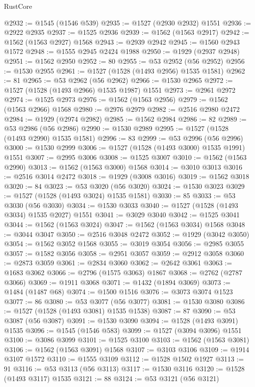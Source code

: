 \begin{lexlean}{RustCore}
\begin{coremodule}
@2932 := @1545 (@1546 @539)
@2935 := @1527 (@2930 @2932) @1551
@2936 := @2922 @2935
@2937 := @1525 @2936
@2939 := @1562 (@1563 @2917)
@2942 := @1562 (@1563 @2927) @1568
@2943 := @2939 @2942
@2945 := @1560 @2943 @1572
@2948 := @1555 @2945 @2424 @1988
@2950 := @1929 (@2937 @2948)
@2951 := @1562 @2950
@2952 := 80
@2955 := @53 @2952 (@56 @2952)
@2956 := @1530 @2955
@2961 := @1527 (@1528 (@1493 @2956) @1535 @1581)
@2962 := 81
@2965 := @53 @2962 (@56 @2962)
@2966 := @1530 @2965
@2972 := @1527 (@1528 (@1493 @2966) @1535 @1987) @1551
@2973 := @2961 @2972
@2974 := @1525 @2973
@2976 := @1562 (@1563 @2956)
@2979 := @1562 (@1563 @2966) @1568
@2980 := @2976 @2979
@2982 := @2516 @2980 @2472
@2984 := @1929 (@2974 @2982)
@2985 := @1562 @2984
@2986 := 82
@2989 := @53 @2986 (@56 @2986)
@2990 := @1530 @2989
@2995 := @1527 (@1528 (@1493 @2990) @1535 @1581)
@2996 := 83
@2999 := @53 @2996 (@56 @2996)
@3000 := @1530 @2999
@3006 := @1527 (@1528 (@1493 @3000) @1535 @1991) @1551
@3007 := @2995 @3006
@3008 := @1525 @3007
@3010 := @1562 (@1563 @2990)
@3013 := @1562 (@1563 @3000) @1568
@3014 := @3010 @3013
@3016 := @2516 @3014 @2472
@3018 := @1929 (@3008 @3016)
@3019 := @1562 @3018
@3020 := 84
@3023 := @53 @3020 (@56 @3020)
@3024 := @1530 @3023
@3029 := @1527 (@1528 (@1493 @3024) @1535 @1581)
@3030 := 85
@3033 := @53 @3030 (@56 @3030)
@3034 := @1530 @3033
@3040 := @1527 (@1528 (@1493 @3034) @1535 @2027) @1551
@3041 := @3029 @3040
@3042 := @1525 @3041
@3044 := @1562 (@1563 @3024)
@3047 := @1562 (@1563 @3034) @1568
@3048 := @3044 @3047
@3050 := @2516 @3048 @2472
@3052 := @1929 (@3042 @3050)
@3054 := @1562 @3052 @1568
@3055 := @3019 @3054
@3056 := @2985 @3055
@3057 := @1582 @3056
@3058 := @2951 @3057
@3059 := @2912 @3058
@3060 := @2873 @3059
@3061 := @2834 @3060
@3062 := @2642 @3061
@3063 := @1683 @3062
@3066 := @2796 (@1575 @3063) @1867
@3068 := @2762 (@2787 @3066)
@3069 := @1911 @3068
@3071 := @1432 (@1894 @3069)
@3073 := @1484 (@1487 @68)
@3074 := @1500 @1516
@3076 := @3073 @3074 @1523
@3077 := 86
@3080 := @53 @3077 (@56 @3077)
@3081 := @1530 @3080
@3086 := @1527 (@1528 (@1493 @3081) @1535 @1538)
@3087 := 87
@3090 := @53 @3087 (@56 @3087)
@3091 := @1530 @3090
@3094 := @1528 (@1493 @3091) @1535
@3096 := @1545 (@1546 @583)
@3099 := @1527 (@3094 @3096) @1551
@3100 := @3086 @3099
@3101 := @1525 @3100
@3103 := @1562 (@1563 @3081)
@3106 := @1562 (@1563 @3091) @1568
@3107 := @3103 @3106
@3109 := @1914 @3107 @1572
@3110 := @1555 @3109
@3112 := @1528 @1502 @1927
@3113 := 91
@3116 := @53 @3113 (@56 @3113)
@3117 := @1530 @3116
@3120 := @1528 (@1493 @3117) @1535
@3121 := 88
@3124 := @53 @3121 (@56 @3121)

\end{coremodule}
\end{lexlean}
